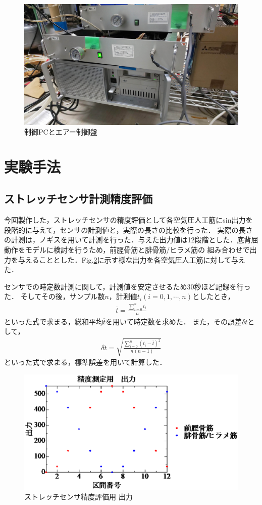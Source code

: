 \begin{figure}[h]
    \begin{center}
     \includegraphics[width=0.65\columnwidth,clip]{./3_analysis/PC.eps}
     \caption{制御PCとエアー制御盤}
     \label{fig:PC}
    \end{center}
\end{figure}

\newpage

\section{実験手法}
\subsection{ストレッチセンサ計測精度評価}
今回製作した，ストレッチセンサの精度評価として各空気圧人工筋にsin出力を段階的に与えて，センサの計測値と，実際の長さの比較を行った．
実際の長さの計測は，ノギスを用いて計測を行った．与えた出力値は12段階とした．底背屈動作をモデルに検討を行うため，前脛骨筋と腓骨筋/ヒラメ筋の
組み合わせで出力を与えることとした．Fig.\ref{output_for_test}に示す様な出力を各空気圧人工筋に対して与えた．

センサでの時定数計測に関して，計測値を安定させるため30秒ほど記録を行った．
そしてその後，サンプル数$n$，計測値$t_i \left(i=0,1,\cdots,n\right)$としたとき，
\begin{eqnarray}
        \overline{t}=\frac{\sum_{i=0}^n t_i}{n}
\end{eqnarray}
といった式で求まる，総和平均$\overline{t}$を用いて時定数を求めた．
また，その誤差$\delta t$として，
\begin{eqnarray}
    \delta t = \sqrt{ \frac{\sum_{i=0}^n \left(t_i-\overline{t}\right)^2}{n(n-1)}}
\end{eqnarray}
といった式で求まる，標準誤差を用いて計算した．

\begin{figure}[h]
    \begin{center}
        \includegraphics[width=0.7\columnwidth,clip]{2_measurement/output/output.eps}
        \caption{ストレッチセンサ精度評価用 出力}
        \label{output_for_test}
    \end{center}
\end{figure}

